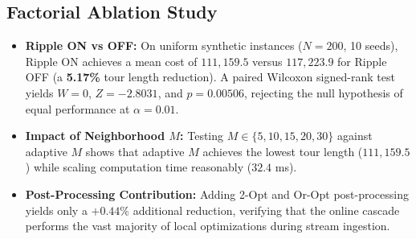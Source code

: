\documentclass{article}
\theoremstyle{definition}
\begin{document}
\begin{table}[t]
\centering
\caption{\textbf{Dynamic Streaming Evaluation.} Evaluates per-insertion latency, tour quality gain, and computational speedup over full static recomputation from scratch.}
\label{tab:dynamic}
\end{table}

\subsection{Factorial Ablation Study}

\begin{itemize}
    \item \textbf{Ripple ON vs OFF:} On uniform synthetic instances ($N = 200$, 10 seeds), Ripple ON achieves a mean cost of $111,159.5$ versus $117,223.9$ for Ripple OFF (a \textbf{5.17\%} tour length reduction). A paired Wilcoxon signed-rank test yields $W = 0$, $Z = -2.8031$, and $p = \mathbf{0.00506}$, rejecting the null hypothesis of equal performance at $\alpha = 0.01$.
    \item \textbf{Impact of Neighborhood $M$:} Testing $M \in \{5, 10, 15, 20, 30\}$ against adaptive $M$ shows that adaptive $M$ achieves the lowest tour length ($111,159.5$) while scaling computation time reasonably ($32.4$ ms).
    \item \textbf{Post-Processing Contribution:} Adding 2-Opt and Or-Opt post-processing yields only a $+0.44\%$ additional reduction, verifying that the online cascade performs the vast majority of local optimizations during stream ingestion.
\end{itemize}
\end{document}
